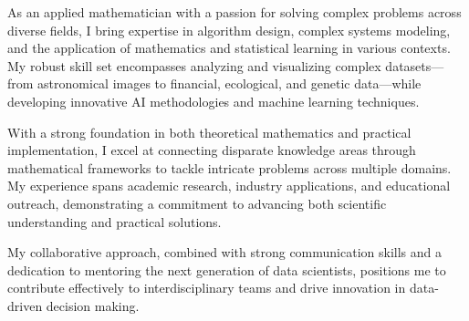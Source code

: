 
\begin{cvparagraph}


As an applied mathematician with a passion for solving complex problems across diverse fields, I bring expertise in algorithm design, complex systems modeling, and the application of mathematics and statistical learning in various contexts. My robust skill set encompasses analyzing and visualizing complex datasets—from astronomical images to financial, ecological, and genetic data—while developing innovative AI methodologies and machine learning techniques.

With a strong foundation in both theoretical mathematics and practical implementation, I excel at connecting disparate knowledge areas through mathematical frameworks to tackle intricate problems across multiple domains. My experience spans academic research, industry applications, and educational outreach, demonstrating a commitment to advancing both scientific understanding and practical solutions.

My collaborative approach, combined with strong communication skills and a dedication to mentoring the next generation of data scientists, positions me to contribute effectively to interdisciplinary teams and drive innovation in data-driven decision making.

\end{cvparagraph}

